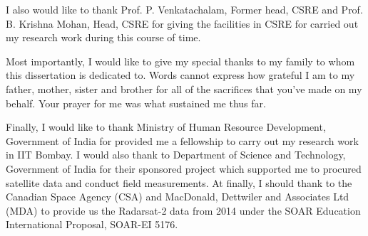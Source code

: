 \documentclass[a4paper,plainchapterheads,yschapters,twoside,truedoublelespace,openright]{iitbthesis}
\begin{document}
\begin{acknowledgments}
I also would like to thank Prof. P. Venkatachalam, Former head, CSRE and Prof. B. Krishna Mohan, Head, CSRE for giving the facilities in CSRE for carried out my research work during this course of time.

Most importantly, I would like to give my special thanks to my family to whom this dissertation is dedicated to. Words cannot express how grateful I am to my father, mother, sister and brother for all of the sacrifices that you’ve made on my behalf. Your prayer for me was what sustained me thus far. 

Finally, I would like to thank Ministry of Human Resource Development, Government of India for provided me a fellowship to carry out my research work in IIT Bombay. I would also thank to Department of Science and Technology, Government of India for their sponsored project which supported me to procured satellite data and conduct field measurements. At finally, I should thank to the Canadian Space Agency (CSA) and MacDonald, Dettwiler and Associates Ltd (MDA) to provide us the Radarsat-2 data from 2014 under the SOAR Education International Proposal, SOAR-EI 5176.


\end{acknowledgments}
\end{document}
